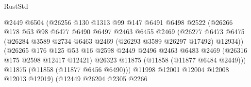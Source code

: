 \begin{lexlean}{RustStd}
\begin{coremodule}
                                  @2449
                                  @6504
                                  (@26256
                                    @130
                                    @1313
                                    @99
                                    @147
                                    @6491
                                    @6498
                                    @2522
                                    (@26266
                                      @178
                                      @53
                                      @98
                                      @6477
                                      @6490
                                      @6497
                                      @2463
                                      @6455
                                      @2469
                                      (@26277
                                        @6473
                                        @6475
                                        (@26284
                                          @3589
                                          @2734
                                          @6463
                                          @2469
                                          (@26293 @3589 @26297 @17492)
                                          @12934))
                                      (@26265
                                        @176
                                        @125
                                        @53
                                        @16
                                        @2598
                                        @2449
                                        @2496
                                        @2463
                                        @6483
                                        @2469
                                        (@26316 @175 @2598 @12417 @12421)
                                        @26323
                                        @11875
                                        (@11858 (@11877 @6484 @2449)))
                                      @11875
                                      (@11858 (@11877 @6456 @6490)))
                                    @11998
                                    @12001
                                    @12004
                                    @12008
                                    @12013
                                    @12019)
                                  (@12449
                                    @26204
                                    @2305
                                    @2266

\end{coremodule}
\end{lexlean}
